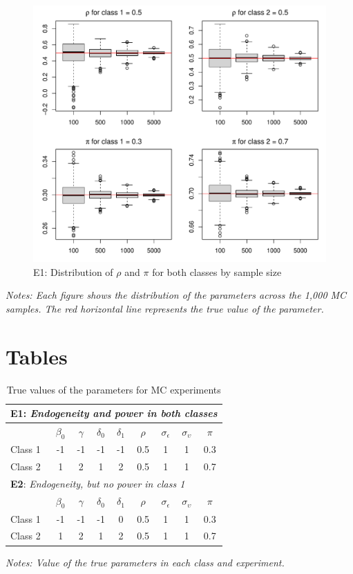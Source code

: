 \documentclass[12pt]{article}
\begin{document}
\begin{figure}[H]
	\caption{E1: Distribution of $\rho$  and $\pi$ for both classes by sample size}\label{fig:figure2}
	\centering
	\includegraphics[width =\textwidth]{fig2} 
\end{figure}
\noindent \textsl{Notes: Each figure shows the distribution of the parameters across the 1,000 MC samples. The red horizontal line represents the true value of the parameter.}


\pagebreak
\section*{Tables}

\begin{longtable}{lcccccccc}
	\caption{True values of the parameters for MC experiments}\label{tab:experiments} \\
		\midrule
		 \multicolumn{9}{l}{\textbf{E1}: \emph{Endogeneity and power in both classes}} \\
		\midrule
		& $\beta_0$  & $\gamma$ & $\delta_0$  & $\delta_1$ & $\rho$ & $\sigma_{\epsilon}$ & $\sigma_{\upsilon}$ & $\pi$ \\
		\midrule
		Class 1 & -1 & -1  & -1  &  -1 & 0.5 & 1 & 1 & 0.3\\
		Class 2 &  1 &  2  &  1  &  2  & 0.5 & 1 & 1 & 0.7\\
		\midrule
	   \multicolumn{9}{l}{\textbf{E2}: \emph{Endogeneity, but no power in class 1}} \\
	   \midrule
	   & $\beta_0$  & $\gamma$ & $\delta_0$  & $\delta_1$ & $\rho$ & $\sigma_{\epsilon}$ & $\sigma_{\upsilon}$ & $\pi$ \\
	   \midrule
	   Class 1 & -1 & -1  & -1  &  0 & 0.5 & 1 & 1 & 0.3\\
	   Class 2 &  1 &  2  &  1  &  2  & 0.5 & 1 & 1 & 0.7\\
	   \midrule
\end{longtable}
\noindent \textsl{Notes: Value of the true parameters in each class and experiment.}
\end{document}
